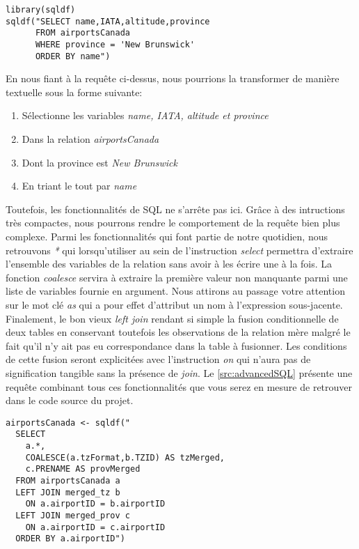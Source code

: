 \begin{lstlisting}[caption = Exemple de requête SQL,label=src:simpleSQL]
library(sqldf)
sqldf("SELECT name,IATA,altitude,province
      FROM airportsCanada
      WHERE province = 'New Brunswick'
      ORDER BY name")
\end{lstlisting}

\vspace{\baselineskip}
\noindent
En nous fiant à la requête ci-dessus, nous pourrions la transformer de manière textuelle sous la forme suivante:
\begin{enumerate}
	\item Sélectionne les variables \emph{name, IATA, altitude et province}
	\item Dans la relation \emph{airportsCanada}
	\item Dont la province est \emph{New Brunswick}
	\item En triant le tout par \emph{name}
\end{enumerate}

\noindent
Toutefois, les fonctionnalités de SQL ne s'arrête pas ici. Grâce à des intructions très compactes, nous pourrons rendre le comportement de la requête bien plus complexe. Parmi les fonctionnalités qui font partie de notre quotidien, nous retrouvons \emph{*} qui lorsqu'utiliser au sein de l'instruction \emph{select} permettra d'extraire l'ensemble des variables de la relation sans avoir à les écrire une à la fois. La fonction \emph{coalesce} servira à extraire la première valeur non manquante parmi une liste de variables fournie en argument. Nous attirons au passage votre attention sur le mot clé \emph{as} qui a pour effet d'attribut un nom à l'expression sous-jacente. Finalement, le bon vieux \emph{left join} rendant si simple la fusion conditionnelle de deux tables en conservant toutefois les observations de la relation mère malgré le fait qu'il n'y ait pas eu correspondance dans la table à fusionner. Les conditions de cette fusion seront explicitées avec l'instruction \emph{on} qui n'aura pas de signification tangible sans la présence de \emph{join}. Le \autoref{src:advancedSQL} présente une requête combinant tous ces fonctionnalités que vous serez en mesure de retrouver dans le code source du projet.

\begin{lstlisting}[caption = Fonctionnalités avancées de SQL,label=src:advancedSQL]
airportsCanada <- sqldf("
  SELECT 
    a.*, 
    COALESCE(a.tzFormat,b.TZID) AS tzMerged,
    c.PRENAME AS provMerged
  FROM airportsCanada a 
  LEFT JOIN merged_tz b
  	ON a.airportID = b.airportID
  LEFT JOIN merged_prov c
  	ON a.airportID = c.airportID
  ORDER BY a.airportID")
\end{lstlisting}

